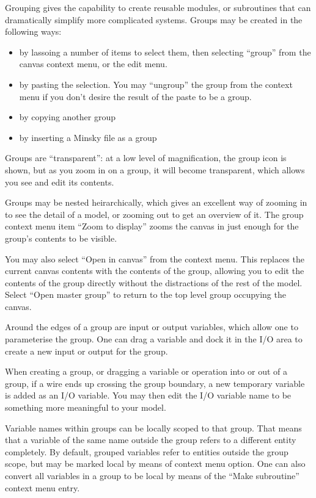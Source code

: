 
Grouping gives the capability to create reusable modules, or subroutines
that can dramatically simplify more complicated systems. Groups may
be created in the following ways: 
\begin{itemize}
\item by lassoing a number of items to select them, then selecting ``group''
from the canvas context menu, or the edit menu. 
\item by pasting the selection. You may ``ungroup'' the group from the
context menu if you don't desire the result of the paste to be a group. 
\item by copying another group 
\item by inserting a Minsky file as a group 
\end{itemize}
Groups are ``transparent'': at a low level of magnification, the
group icon is shown, but as you zoom in on a group, it will become
transparent, which allows you see and edit its contents. 

Groups may be nested heirarchically, which gives an excellent way
of zooming in to see the detail of a model, or zooming out to get
an overview of it. The group context menu item ``Zoom to display''
zooms the canvas in just enough for the group's contents to be visible.

You may also select ``Open in canvas'' from the context menu. This
replaces the current canvas contents with the contents of the group,
allowing you to edit the contents of the group directly without the
distractions of the rest of the model. Select ``Open master group''
to return to the top level group occupying the canvas.

Around the edges of a group are input or output variables, which allow
one to parameterise the group. One can drag a variable and dock it
in the I/O area to create a new input or output for the group.

When creating a group, or dragging a variable or operation into or
out of a group, if a wire ends up crossing the group boundary, a new
temporary variable is added as an I/O variable. You may then edit
the I/O variable name to be something more meaningful to your model.

Variable names within groups can be locally scoped to that group.
That means that a variable of the same name outside the group refers
to a different entity completely. By default, grouped variables refer
to entities outside the group scope, but may be marked local by means
of context menu option. One can also convert all variables in a group
to be local by means of the ``Make subroutine'' context menu entry.

